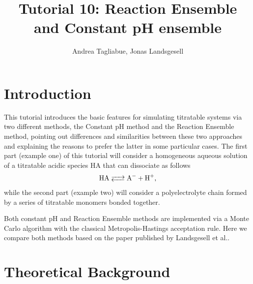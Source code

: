 \documentclass[
a4paper,                        %
11pt,                           %
twoside,                        %
footsepline,                    %
headsepline,                    %
headexclude,                    %
footexclude,                    %
pagesize,                       %
]{scrartcl}
\begin{document}
\title{Tutorial 10: Reaction Ensemble and Constant pH ensemble}
\author{Andrea Tagliabue, Jonas Landsgesell}

\maketitle
\tableofcontents

\section{Introduction}

This tutorial introduces the basic features for simulating titratable systems via two different methods, the Constant pH method and the Reaction Ensemble method, pointing out differences and similarities between these two approaches and explaining the reasons to prefer the latter in some particular cases.
The first part (example one) of this tutorial will consider a homogeneous aqueous solution of a titratable acidic species HA that can dissociate as follows
\begin{equation}\label{disso}
\ce{HA <--> A- + H+}\text{,}
\end{equation}
while the second part (example two) will consider a polyelectrolyte chain formed by a series of titratable monomers bonded together.

\noindent Both constant pH and Reaction Ensemble methods are implemented via a Monte Carlo algorithm with the classical Metropolis-Hastings acceptation rule. Here we compare both methods based on the paper published by Landsgesell et al.\cite{landsgesell2017simulation}.

\section{Theoretical Background}
\end{document}
